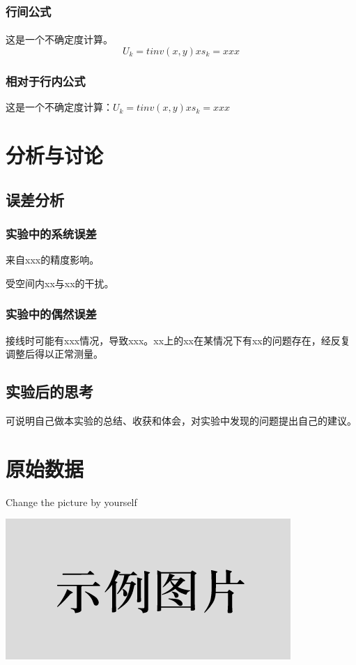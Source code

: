 \documentclass[UTF8]{ctexart}
\begin{document}
\subsubsection{行间公式}
\paragraph{}这是一个不确定度计算。
\[
U_k=tinv(x,y)xs_k=xxx
\]
\subsubsection{相对于行内公式}
这是一个不确定度计算：$U_k=tinv(x,y)xs_k=xxx$


\section{分析与讨论}

\subsection{误差分析}

\subsubsection{实验中的系统误差}
来自xxx的精度影响。

受空间内xx与xx的干扰。

\subsubsection{实验中的偶然误差}
接线时可能有xxx情况，导致xxx。xx上的xx在某情况下有xx的问题存在，经反复调整后得以正常测量。

\subsection{实验后的思考}
可说明自己做本实验的总结、收获和体会，对实验中发现的问题提出自己的建议。

\newpage
\section{原始数据}
\begin{center}
    Change the picture by yourself
    
    
    \includegraphics{picture/example.png}
\end{center}




\end{document}
